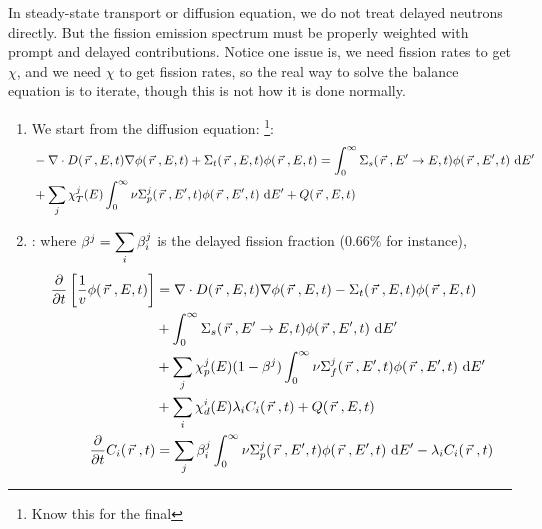 \documentclass{school-22.211-notes}
\begin{document}
\clearpage
{}
In steady-state transport or diffusion equation, we do not treat delayed neutrons directly. But the fission emission spectrum must be properly weighted with prompt and delayed contributions. Notice one issue is, we need fission rates to get $\chi$, and we need $\chi$ to get fission rates, so the real way to solve the balance equation is to iterate, though this is not how it is done normally.
\begin{enumerate}
\item We start from the diffusion equation: \footnote{Know this for the final}: 
\small
\begin{align}
& - \nabla \cdot D(\left.\vec{r}\right., E, t) \nabla \phi(\left.\vec{r}\right., E, t) + \Sigma_t (\left.\vec{r}\right., E, t) \phi(\left.\vec{r}\right., E, t) = \int_0^{\infty} \Sigma_s (\left.\vec{r}\right., E'\to E, t) \phi(\left.\vec{r}\right., E', t) \mbox{ }\mathrm{d} E' \\
&+ \displaystyle\sum_j \chi_T^j (E) \int_0^{\infty} \nu \Sigma_p^j (\left.\vec{r}\right., E', t) \phi(\left.\vec{r}\right., E', t) \mbox{ }\mathrm{d} E' + Q(\left.\vec{r}\right., E, t) 
\end{align}
\normalsize

\item {}: where $\beta^j = \displaystyle\sum_i \beta_i^j$ is the delayed fission fraction (0.66\% for instance), 
  \begin{align}
    \frac{\partial}{\partial t} \left[ \frac{1}{v} \phi(\left.\vec{r}\right., E, t) \right] &= \nabla \cdot D(\left.\vec{r}\right., E, t) \nabla \phi(\left.\vec{r}\right., E, t) - \Sigma_t (\left.\vec{r}\right., E, t) \phi(\left.\vec{r}\right., E, t) 
\notag \\
    & + \int_0^{\infty} \Sigma_s (\left.\vec{r}\right., E'\to E, t) \phi(\left.\vec{r}\right., E', t) \mbox{ }\mathrm{d} E'\notag \\
    &+ \displaystyle\sum_j \chi_p^j (E) (1-\beta^j) \int_0^{\infty} \nu \Sigma_f^j (\left.\vec{r}\right., E', t) \phi(\left.\vec{r}\right., E', t) \mbox{ }\mathrm{d} E'\notag \\
    &+ \displaystyle\sum_i \chi_d^i (E) \lambda_i C_i (\left.\vec{r}\right., t) + Q(\left.\vec{r}\right., E, t)\\
    \frac{\partial}{\partial t} C_i (\left.\vec{r}\right., t) &= \displaystyle\sum_j \beta_i^j \int_0^{\infty} \nu \Sigma_p^j (\left.\vec{r}\right., E', t) \phi(\left.\vec{r}\right., E', t) \mbox{ }\mathrm{d} E'  - \lambda_i C_i (\left.\vec{r}\right., t) 
  \end{align}


\end{enumerate}
\end{document}

